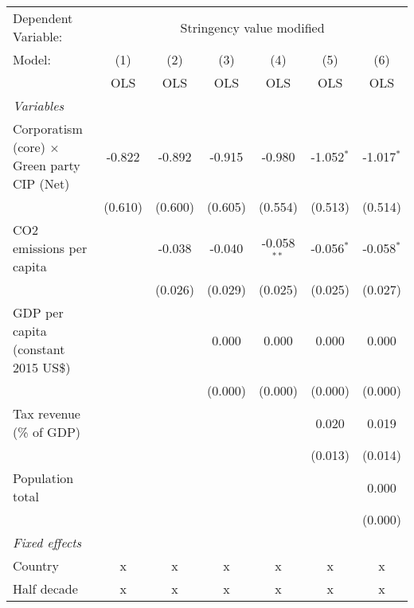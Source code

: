 
\begingroup
\centering
\begin{tabular}{lcccccc}
   \toprule
   Dependent Variable: & \multicolumn{6}{c}{Stringency value modified}\\
   Model:                                             & (1)     & (2)     & (3)     & (4)           & (5)          & (6)\\  
                                                      &  OLS    & OLS     & OLS     & OLS           & OLS          & OLS\\  
   \midrule
   \emph{Variables}\\
   Corporatism (core) $\times$ Green party CIP (Net)  & -0.822  & -0.892  & -0.915  & -0.980        & -1.052$^{*}$ & -1.017$^{*}$\\   
                                                      & (0.610) & (0.600) & (0.605) & (0.554)       & (0.513)      & (0.514)\\   
   CO2 emissions per capita                           &         & -0.038  & -0.040  & -0.058$^{**}$ & -0.056$^{*}$ & -0.058$^{*}$\\   
                                                      &         & (0.026) & (0.029) & (0.025)       & (0.025)      & (0.027)\\   
   GDP per capita (constant 2015 US\$)                &         &         & 0.000   & 0.000         & 0.000        & 0.000\\   
                                                      &         &         & (0.000) & (0.000)       & (0.000)      & (0.000)\\   
   Tax revenue (\% of GDP)                            &         &         &         &               & 0.020        & 0.019\\   
                                                      &         &         &         &               & (0.013)      & (0.014)\\   
   Population total                                   &         &         &         &               &              & 0.000\\   
                                                      &         &         &         &               &              & (0.000)\\   
   \emph{Fixed effects}\\
   Country                                            & x       & x       & x       & x             & x            & x\\  
   Half decade                                        & x       & x       & x       & x             & x            & x\\  

\end{tabular}

